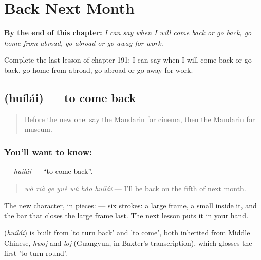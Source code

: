 
\chapter{Back Next Month}
\label{ch:zh-back-next-month}

\begin{chapteropening}
\textbf{By the end of this chapter:} \emph{I can say when I will come back or go back, go home from abroad, go abroad or go away for work.}

Complete the last lesson of chapter 191: I can say when I will come back or go back, go home from abroad, go abroad or go away for work.
\end{chapteropening}

\section[\texorpdfstring{\zh{回来} (huílái)}{回来 (huílái)}]{ (huílái) — to come back}

\label{lesson:ZH-C191-huilai}



\begin{quote}
Before the new one: say the Mandarin for cinema, then the Mandarin for museum.
\end{quote}

\subsection*{You'll want to know: }
\textbf{} — \emph{huílái} — \textquotedblleft{}to come back\textquotedblright{}.

\begin{quote}
\textbf{} \emph{wǒ xià ge yuè wǔ hào huílái} — I'll be back on the fifth of next month.
\end{quote}

The new character, in pieces:  — six strokes: a large frame, a small  inside it, and the bar that closes the large frame last. The next lesson puts it in your hand.

\begin{cousinweb}
\textbf{} (\emph{huílái}) is built from  'to turn back' and  'to come', both inherited from Middle Chinese, \emph{hwoj} and \emph{loj} (Guangyun, in Baxter's transcription), which glosses the first 'to turn round'.
\end{cousinweb}

